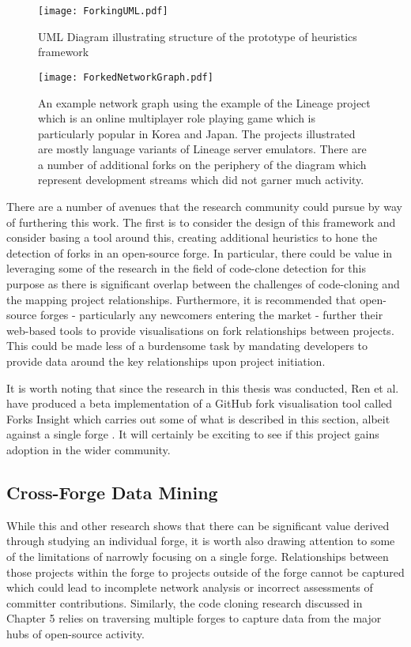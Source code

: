 \begin{figure}[htbp!] 
\centering    
\texttt{[image: ForkingUML.pdf]}
\caption{UML Diagram illustrating structure of the prototype of heuristics framework}
\label{fig:ForkingUML}
\end{figure}

\begin{figure}[htbp!] 
\centering    
\texttt{[image: ForkedNetworkGraph.pdf]}
\caption[An example network graph using the example of the Lineage project.]{An example network graph using the example of the Lineage project which is an online multiplayer role playing game which is particularly popular in Korea and Japan. The projects illustrated are mostly language variants of Lineage server emulators. There are a number of additional forks on the periphery of the diagram which represent development streams which did not garner much activity.}
\label{fig:ForkedNetworkGraph}
\end{figure}

There are a number of avenues that the research community could pursue by way of furthering this work. The first is to consider the design of this framework and consider basing a tool around this, creating additional heuristics to hone the detection of forks in an open-source forge. In particular, there could be value in leveraging some of the research in the field of code-clone detection for this purpose as there is significant overlap between the challenges of code-cloning and the mapping project relationships. Furthermore, it is recommended that open-source forges - particularly any newcomers entering the market - further their web-based tools to provide visualisations on fork relationships between projects. This could be made less of a burdensome task by mandating developers to provide data around the key relationships upon project initiation.

It is worth noting that since the research in this thesis was conducted, Ren et al. have produced a beta implementation of a GitHub fork visualisation tool called Forks Insight which carries out some of what is described in this section, albeit against a single forge \citep{ren2018forks}. It will certainly be exciting to see if this project gains adoption in the wider community.

\subsection{Cross-Forge Data Mining}
While this and other research shows that there can be significant value derived through studying an individual forge, it is worth also drawing attention to some of the limitations of narrowly focusing on a single forge. Relationships between those projects within the forge to projects outside of the forge cannot be captured which could lead to incomplete network analysis or incorrect assessments of committer contributions. Similarly, the code cloning research discussed in Chapter 5 relies on traversing multiple forges to capture data from the major hubs of open-source activity.

